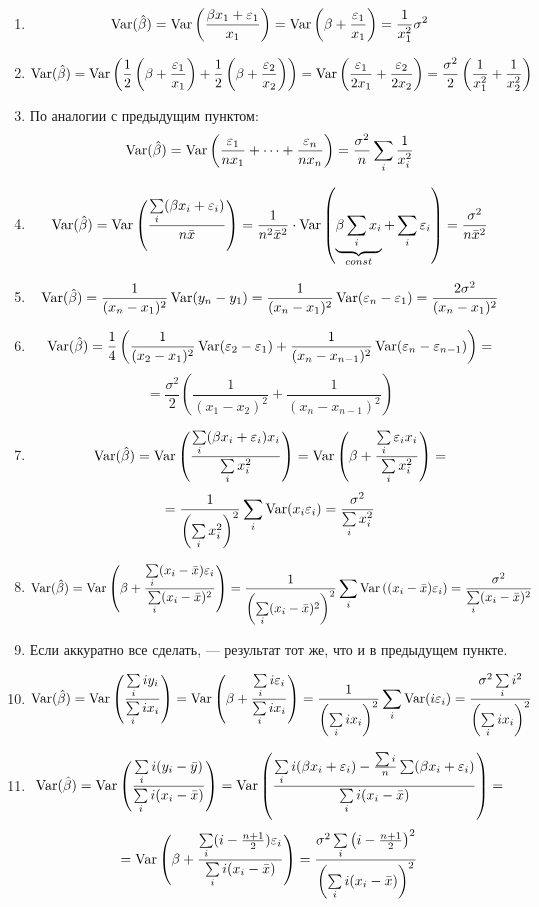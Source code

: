\begin{problem}
\begin{sol}
 \begin{enumerate}
 \item
 \[
 \operatorname{Var}(\hat{\beta}) = \operatorname{Var}\left(\frac{\beta x_1 + \varepsilon_1}{x_1}\right) =
 \operatorname{Var}\left(\beta + \frac{\varepsilon_1}{x_1}\right) = \frac{1}{x_1^2}\sigma^2
 \]
 \item
 \[
 \operatorname{Var}(\hat{\beta}) = \operatorname{Var}\left(\frac{1}{2}\left( \beta + \frac{ \varepsilon_1}{x_1}\right) + \frac{1}{2}\left(\beta + \frac{ \varepsilon_2}{x_2}\right)\right) = \operatorname{Var} \left( \frac{\varepsilon_1}{2x_1} + \frac{\varepsilon_2}{2x_2} \right) = \frac{\sigma^2}{2}\left( \frac{1}{x_1^2} + \frac{1}{x_2^2}\right)
 \]
 \item По аналогии с предыдущим пунктом:
 \[
  \operatorname{Var}(\hat{\beta}) = \operatorname{Var} \left( \frac{\varepsilon_1}{nx_1} + \dots + \frac{\varepsilon_n}{nx_n} \right) = \frac{\sigma^2}{n}\sum_{i}\frac{1}{x_i^2}
 \]
 \item
 \[
 \operatorname{Var}(\hat{\beta}) = \operatorname{Var} \left( \frac{\sum\limits_i (\beta x_i + \varepsilon_i)}{n\bar{x}}\right) = \frac{1}{n^2\bar{x}^2}\cdot \operatorname{Var}\left(\underbrace{\beta\sum\limits_ix_i}_{const} + \sum\limits_i \varepsilon_i\right) = \frac{\sigma^2}{n\bar{x}^2}
 \]
 \item
 \[
 \operatorname{Var}(\hat{\beta}) = \frac{1}{(x_n-x_1)^2}\operatorname{Var}(y_n-y_1) = \frac{1}{(x_n-x_1)^2}\operatorname{Var}(\varepsilon_n - \varepsilon_1) = \frac{2\sigma^2}{(x_n-x_1)^2}
 \]
 \item
 \[
  \operatorname{Var}(\hat{\beta}) =  \frac{1}{4}\left(\frac{1}{(x_2-x_1)^2}\operatorname{Var}(\varepsilon_2-\varepsilon_1) + \frac{1}{(x_n-x_{n-1})^2}\operatorname{Var}(\varepsilon_n-\varepsilon_{n-1})\right) =
 \]
 \[
 = \frac{\sigma^2}{2}\left( \frac{1}{(x_1-x_2)^2} +\frac{1}{(x_n-x_{n-1})^2} \right)
 \]
 \item
 \[
  \operatorname{Var}(\hat{\beta}) = \operatorname{Var}\left(\frac{\sum\limits_i(\beta x_i + \varepsilon_i)x_i}{\sum\limits_i x_i^2}\right) = \operatorname{Var}\left(\beta + \frac{\sum\limits_i\varepsilon_ix_i}{\sum\limits_i x_i^2}\right) =
 \]
 \[
 = \frac{1}{\left(\sum\limits_i x_i^2\right)^2}\sum\limits_i\operatorname{Var}(x_i\varepsilon_i)  = \frac{\sigma^2}{\sum\limits_ix_i^2}
 \]
 \item
 \[
 \operatorname{Var}(\hat{\beta}) = \operatorname{Var}\left(\beta + \frac{\sum\limits_i(x_i-\bar{x})\varepsilon_i}{\sum\limits_i (x_i-\bar{x})^2}\right) = \frac{1}{\left(\sum\limits_i (x_i-\bar{x})^2\right)^2}\sum\limits_i\operatorname{Var}\left((x_i-\bar{x})\varepsilon_i \right)= \frac{\sigma^2}{\sum\limits_i (x_i-\bar{x})^2}
 \]
 \item Если аккуратно все сделать, — результат тот же, что и в предыдущем пункте.
 \item
 \[
 \operatorname{Var}(\hat{\beta}) = \operatorname{Var}\left(\frac{\sum\limits_i iy_i}{\sum\limits_i ix_i}\right) = \operatorname{Var}\left(\beta + \frac{\sum\limits_i i\varepsilon_i}{\sum\limits_i ix_i}\right) = \frac{1}{\left(\sum\limits_i ix_i\right)^2}\sum\limits_i\operatorname{Var}(i\varepsilon_i) = \frac{\sigma^2\sum\limits_i i^2}{\left(\sum\limits_i ix_i\right)^2}
 \]
 \item
 \[
 \operatorname{Var}(\hat{\beta}) = \operatorname{Var}\left(\frac{\sum\limits_i i(y_i-\bar{y})}{\sum\limits_i i(x_i-\bar{x})}\right) = \operatorname{Var}\left( \frac{ \sum\limits_i i(\beta x_i + \varepsilon_i) - \frac{\sum i}{n}\sum\limits(\beta x_i + \varepsilon_i)}{\sum\limits_i i(x_i - \bar{x})} \right) =
 \]
 \[
 = \operatorname{Var}\left( \beta + \frac{\sum\limits_i(i-\frac{n+1}{2})\varepsilon_i}{\sum\limits_i i(x_i-\bar{x})} \right) = \frac{\sigma^2\sum\limits_i \left(i - \frac{n+1}{2}\right)^2}{\left(\sum\limits_i i(x_i-\bar{x})\right)^2}
 \]


\end{enumerate}
\end{sol}
\end{problem}
